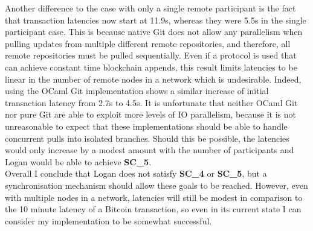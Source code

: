 \documentclass[12pt,a4paper,twoside,openright]{report}
\begin{document}
	Another difference to the case with only a single remote participant is the fact that transaction latencies now start at 11.9s, whereas they were 5.5s in the single participant case.
	This is because native Git does not allow any parallelism when pulling updates from multiple different remote repositories, and therefore, all remote repositories must be pulled sequentially.
	Even if a protocol is used that can achieve constant time blockchain appends, this result limits latencies to be linear in the number of remote nodes in a network which is undesirable. 
	Indeed, using the OCaml Git implementation shows a similar increase of initial transaction latency from 2.7s to 4.5s.
	It is unfortunate that neither OCaml Git nor pure Git are able to exploit more levels of IO parallelism, because it is not unreasonable to expect that these implementations should be able to handle concurrent pulls into isolated branches. 
	Should this be possible, the latencies would only increase by a modest amount with the number of participants and Logan would be able to achieve \textbf{SC\_5}.\\

	Overall I conclude that Logan does not satisfy \textbf{SC\_4} or \textbf{SC\_5}, but a synchronisation mechanism should allow these goals to be reached. 
	However, even with multiple nodes in a network, latencies will still be modest in comparison to the 10 minute latency of a Bitcoin transaction, so even in its current state I can consider my implementation to be somewhat successful.
\end{document}
